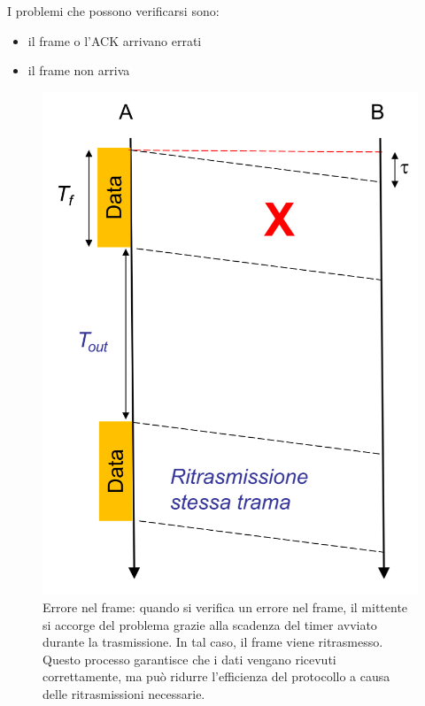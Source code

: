 I problemi che possono verificarsi sono:
\begin{multicols}{2}
\begin{itemize}
    \item il frame o l'ACK arrivano errati
    \item il frame non arriva
\end{itemize}
\end{multicols}

\begin{figure}[htbp]
    \centering
    \begin{minipage}{0.44\textwidth}
        \includegraphics[width=\linewidth]{images/erroreframe.png}
        \caption{Errore nel frame: quando si verifica un errore nel frame, il mittente si accorge del problema grazie alla scadenza del timer avviato durante la trasmissione. 
        In tal caso, il frame viene ritrasmesso. Questo processo garantisce che i dati vengano ricevuti correttamente, ma può ridurre l'efficienza del protocollo a causa delle ritrasmissioni necessarie.}

\end{minipage}
\end{figure}
